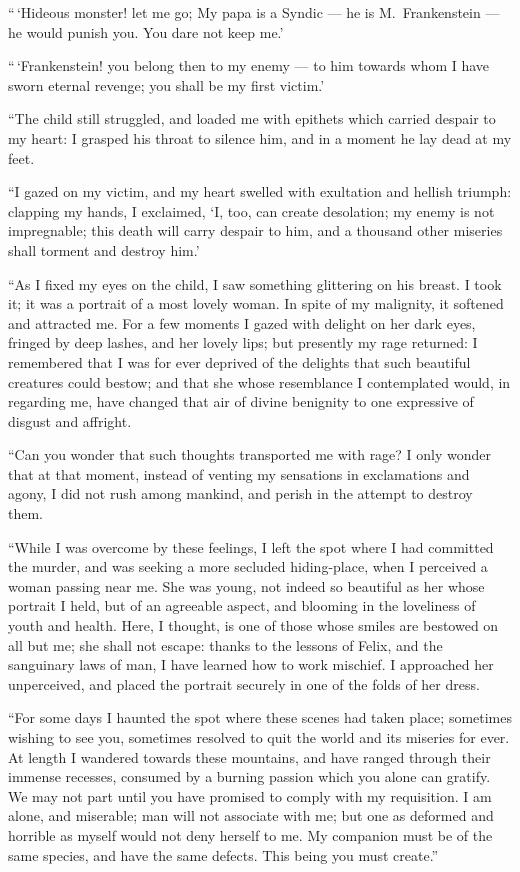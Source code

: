 ``\,`Hideous monster! let me go;
My papa is a Syndic --- he is M.~Frankenstein --- he
would punish you. You
dare not keep me.'

``\,`Frankenstein! you belong then
to my enemy --- to him towards whom
I have sworn eternal revenge; you
shall be my first victim.'

``The child still struggled, and
loaded me with epithets which carried
despair to my heart: I grasped his
throat to silence him, and in a moment
he lay dead at my feet.

``I gazed on my victim, and my
heart swelled with exultation and hellish
triumph: clapping my hands, I exclaimed,
`I, too, can create desolation;
my enemy is not impregnable; this
death will carry despair to him, and a
thousand other miseries shall torment
and destroy him.'

``As I fixed my eyes on the child, I
saw something glittering on his breast.
I took it; it was a portrait of a most
lovely woman. In spite of my malignity,
it softened and attracted me.
For a few moments I gazed with delight
on her dark eyes, fringed by deep lashes,
and her lovely lips; but presently my
rage returned: I remembered that I
was for ever deprived of the delights
that such beautiful creatures could bestow;
and that she whose resemblance
I contemplated would, in regarding me,
have changed that air of divine benignity
to one expressive of disgust and
affright.

``Can you wonder that such thoughts
transported me with rage? I only
wonder that at that moment, instead of
venting my sensations in exclamations
and agony, I did not rush among mankind,
and perish in the attempt to destroy
them.

``While I was overcome by these
feelings, I left the spot where I had
committed the murder, and was seeking
a more secluded hiding-place, when
I perceived a woman passing near me.
She was young, not indeed so beautiful
as her whose portrait I held, but of an
agreeable aspect, and blooming in the
loveliness of youth and health. Here,
I thought, is one of those whose smiles
are bestowed on all but me; she shall
not escape: thanks to the lessons of
Felix, and the sanguinary laws of man,
I have learned how to work mischief. I
approached her unperceived, and placed
the portrait securely in one of the folds
of her dress.

``For some days I haunted the spot
where these scenes had taken place;
sometimes wishing to see you, sometimes
resolved to quit the world and its
miseries for ever. At length I wandered
towards these mountains, and
have ranged through their immense recesses,
consumed by a burning passion
which you alone can gratify. We may
not part until you have promised to
comply with my requisition. I am
alone, and miserable; man will not associate
with me; but one as deformed
and horrible as myself would not deny
herself to me. My companion must be
of the same species, and have the same
defects. This being you must create.''

